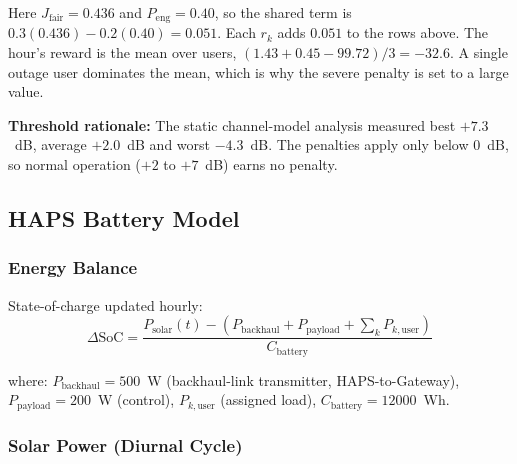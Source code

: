 \documentclass[conference]{IEEEtran}
\begin{document}
\begin{center}
\end{center}

\noindent Here $J_\mathrm{fair}=0.436$ and $P_\mathrm{eng}=0.40$, so the shared term is $0.3(0.436)-0.2(0.40)=0.051$. Each $r_k$ adds $0.051$ to the rows above. The hour's reward is the mean over users, $(1.43+0.45-99.72)/3=-32.6$. A single outage user dominates the mean, which is why the severe penalty is set to a large value.

\noindent \textbf{Threshold rationale:} The static channel-model analysis measured best $+7.3$~dB, average $+2.0$~dB and worst $-4.3$~dB. The penalties apply only below $0$~dB, so normal operation ($+2$ to $+7$~dB) earns no penalty.

\subsection{HAPS Battery Model}

\subsubsection{Energy Balance}

State-of-charge updated hourly:
\begin{equation}
\Delta \text{SoC} = \frac{P_{\text{solar}}(t) - (P_{\text{backhaul}} + P_{\text{payload}} + \sum_k P_{k,\text{user}})}{C_{\text{battery}}}
\label{eq:battery-balance}
\end{equation}

where: $P_{\text{backhaul}} = 500$~W (backhaul-link transmitter, HAPS-to-Gateway), $P_{\text{payload}} = 200$~W (control), $P_{k,\text{user}}$ (assigned load), $C_{\text{battery}} = 12000$~Wh.

\subsubsection{Solar Power (Diurnal Cycle)}
\end{document}
